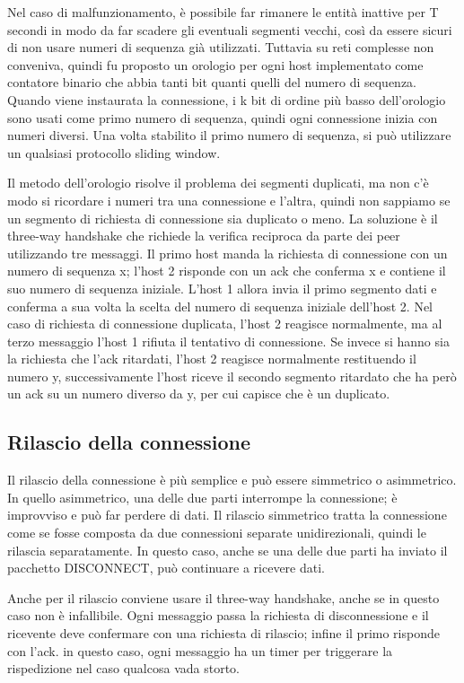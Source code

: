 Nel caso di malfunzionamento, è possibile far rimanere le entità inattive per T secondi in modo da far scadere gli eventuali segmenti vecchi, così da essere sicuri di non usare numeri di sequenza già utilizzati.
Tuttavia su reti complesse non conveniva, quindi fu proposto un orologio per ogni host implementato come contatore binario che abbia tanti bit quanti quelli del numero di sequenza.
Quando viene instaurata la connessione, i k bit di ordine più basso dell'orologio sono usati come primo numero di sequenza, quindi ogni connessione inizia con numeri diversi.
Una volta stabilito il primo numero di sequenza, si può utilizzare un qualsiasi protocollo sliding window.

Il metodo dell'orologio risolve il problema dei segmenti duplicati, ma non c'è modo si ricordare i numeri tra una connessione e l'altra, quindi non sappiamo se un segmento di richiesta di connessione sia duplicato o meno.
La soluzione è il three-way handshake che richiede la verifica reciproca da parte dei peer utilizzando tre messaggi.
Il primo host manda la richiesta di connessione con un numero di sequenza x; l'host 2 risponde con un ack che conferma x e contiene il suo numero di sequenza iniziale. L'host 1 allora invia il primo segmento dati e conferma a sua volta la scelta del numero di sequenza iniziale dell'host 2.
Nel caso di richiesta di connessione duplicata, l'host 2 reagisce normalmente, ma al terzo messaggio l'host 1 rifiuta il tentativo di connessione.
Se invece si hanno sia la richiesta che l'ack ritardati, l'host 2 reagisce normalmente restituendo il numero y, successivamente l'host riceve il secondo segmento ritardato che ha però un ack su un numero diverso da y, per cui capisce che è un duplicato.

\subsection{Rilascio della connessione}
Il rilascio della connessione è più semplice e può essere simmetrico o asimmetrico.
In quello asimmetrico, una delle due parti interrompe la connessione; è improvviso e può far perdere di dati.
Il rilascio simmetrico tratta la connessione come se fosse composta da due connessioni separate unidirezionali, quindi le rilascia separatamente.
In questo caso, anche se una delle due parti ha inviato il pacchetto DISCONNECT, può continuare a ricevere dati.

Anche per il rilascio conviene usare il three-way handshake, anche se in questo caso non è infallibile.
Ogni messaggio passa la richiesta di disconnessione e il ricevente deve confermare con una richiesta di rilascio; infine il primo risponde con l'ack.
in questo caso, ogni messaggio ha un timer per triggerare la rispedizione nel caso qualcosa vada storto.

